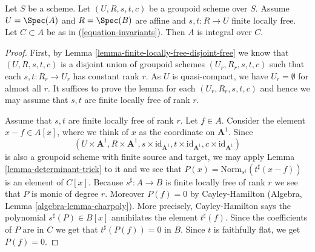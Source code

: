 \begin{lemma}
\label{lemma-integral-over-invariants}
Let $S$ be a scheme. Let $(U, R, s, t, c)$ be a groupoid scheme over $S$.
Assume $U = \Spec(A)$ and $R = \Spec(B)$ are affine and
$s, t : R \to U$ finite locally free.
Let $C \subset A$ be as in (\ref{equation-invariants}).
Then $A$ is integral over $C$.
\end{lemma}

\begin{proof}
First, by Lemma \ref{lemma-finite-locally-free-disjoint-free}
we know that $(U, R, s, t, c)$ is a disjoint union
of groupoid schemes $(U_r, R_r, s, t, c)$ such that each $s, t : R_r \to U_r$
has constant rank $r$. As $U$ is quasi-compact, we have $U_r = \emptyset$ for
almost all $r$. It suffices to prove the lemma for each $(U_r, R_r, s, t, c)$
and hence we may assume that $s, t$ are finite locally free of rank $r$.

\medskip\noindent
Assume that $s, t$ are finite locally free of rank $r$.
Let $f \in A$. Consider the element $x - f \in A[x]$, where we think
of $x$ as the coordinate on $\mathbf{A}^1$.
Since
$$
(U \times \mathbf{A}^1, R \times \mathbf{A}^1,
s \times \text{id}_{\mathbf{A}^1},
t \times \text{id}_{\mathbf{A}^1},
c \times \text{id}_{\mathbf{A}^1})
$$
is also a groupoid scheme with finite source and target, we may apply
Lemma \ref{lemma-determinant-trick} to it and we see that
$P(x) = \text{Norm}_{s^\sharp}(t^\sharp(x - f))$
is an element of $C[x]$. Because $s^\sharp : A \to B$ is finite locally
free of rank $r$ we see that $P$ is monic of degree $r$.
Moreover $P(f) = 0$ by Cayley-Hamilton
(Algebra, Lemma \ref{algebra-lemma-charpoly}).
More precisely, Cayley-Hamilton says the polynomial
$s^\sharp(P) \in B[x]$ annihilates the element $t^\sharp(f)$.
Since the coefficients of $P$ are in $C$ we get that
$t^\sharp(P(f)) = 0$ in $B$. Since $t$ is faithfully flat,
we get $P(f) = 0$.
\end{proof}

